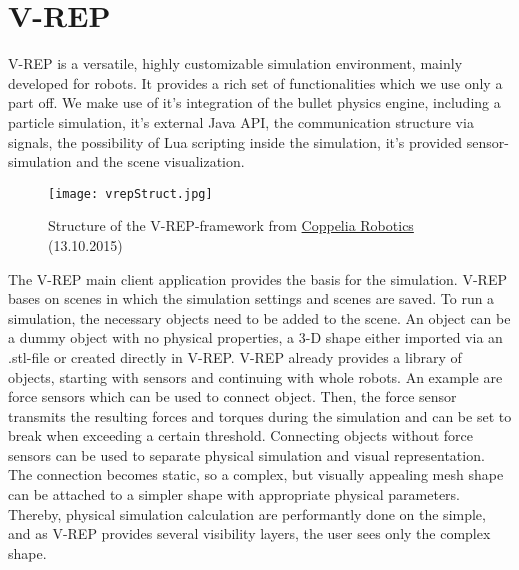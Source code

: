     \section{V-REP}
    \label{sec:theoryVrep}
    V-REP is a versatile, highly customizable simulation environment, mainly developed for robots. 
    It provides a rich set of functionalities which we use only a part off.  
    We make use of it's integration of the bullet physics engine, including a particle simulation, it's external Java API, the communication structure via signals, the possibility of Lua scripting inside the simulation, it's provided sensor-simulation and the scene visualization.
    \begin{figure}[h!]
     \begin{center}
      \texttt{[image: vrepStruct.jpg]}
     \end{center}
      \caption{Structure of the V-REP-framework from \href{http://www.coppeliarobotics.com/helpFiles/en/images/writingCode1.jpg}{Coppelia Robotics} (13.10.2015) \label{fig:vrepStruct}}
    \end{figure}
    
    The V-REP main client application provides the basis for the simulation. 
    V-REP bases on scenes in which the simulation settings and scenes are saved. 
    To run a simulation, the necessary objects need to be added to the scene. 
    An object can be a dummy object with no physical properties, a 3-D shape either imported via an .stl-file or created directly in V-REP. 
    V-REP already provides a library of objects, starting with sensors and continuing with whole robots. 
    An example are force sensors which can be used to connect object. 
    Then, the force sensor transmits the resulting forces and torques during the simulation and can be set to break when exceeding a certain threshold. 
    Connecting objects without force sensors can be used to separate physical simulation and visual representation. 
    The connection becomes static, so a complex, but visually appealing mesh shape can be attached to a simpler shape with appropriate physical parameters. 
    Thereby, physical simulation calculation are performantly done on the simple, and as V-REP provides several visibility layers, the user sees only the complex shape.
    
